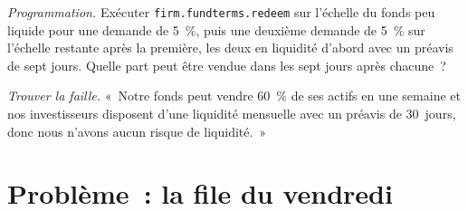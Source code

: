 \begin{exercise}[$\star\star\star$]\label{exo:fm:the-asset-manager-and-the-fund:7}
\emph{Programmation.} Exécuter \texttt{firm.fundterms.redeem} sur l'échelle du fonds peu liquide pour une demande de 5~\%, puis une deuxième demande de 5~\% sur l'échelle restante après la
première, les deux en liquidité d'abord avec un préavis de sept jours. Quelle part peut être vendue dans les sept jours après chacune~?
\end{exercise}

\begin{exercise}[$\star\star\star$]\label{exo:fm:the-asset-manager-and-the-fund:8}
\emph{Trouver la faille.} «~Notre fonds peut vendre 60~\% de ses actifs en une semaine et nos investisseurs disposent d'une liquidité mensuelle avec un préavis de 30~jours, donc nous
n'avons aucun risque de liquidité.~»
\end{exercise}

\section{Problème~: la file du vendredi}

